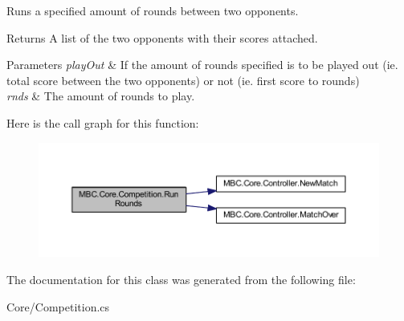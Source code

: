 Runs a specified amount of rounds between two opponents.

\begin{DoxyReturn}{Returns}
A list of the two opponents with their scores attached.
\end{DoxyReturn}

\begin{DoxyParams}{Parameters}
{\em play\-Out} & If the amount of rounds specified is to be played out (ie. total score between the two opponents) or not (ie. first score to rounds)\\
\hline
{\em rnds} & The amount of rounds to play.\\
\hline
\end{DoxyParams}


Here is the call graph for this function\-:\nopagebreak
\begin{figure}[H]
\begin{center}
\leavevmode
\includegraphics[width=350pt]{class_m_b_c_1_1_core_1_1_competition_ae6f1520c4f77bef9f8b9760b40517857_cgraph}
\end{center}
\end{figure}




The documentation for this class was generated from the following file\-:\begin{DoxyCompactItemize}
\item 
Core/Competition.\-cs\end{DoxyCompactItemize}
